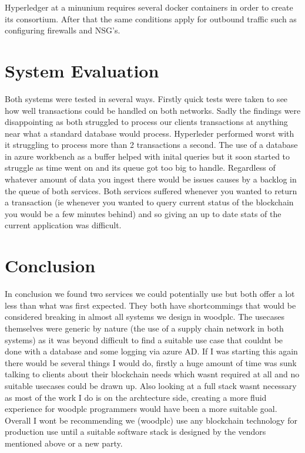 \documentclass[runningheads]{llncs}
\begin{document}
Hyperledger at a minunium requires several docker containers in order to create its consortium. After that the same conditions apply for outbound traffic such as configuring firewalls and NSG's.

\section{System Evaluation}
Both systems were tested in several ways. Firstly quick tests were taken to see how well transactions could be handled on both networks. Sadly the findings were disappointing as both struggled to process our clients transactions at anything near what a standard database would process. Hyperleder performed worst with it struggling to process more than 2 transactions a second. The use of a database in azure workbench as a buffer helped with inital queries but it soon started to struggle as time went on and its queue got too big to handle. Regardless of whatever amount of data you ingest there would be issues causes by a backlog in the queue of both services. Both services suffered whenever you wanted to return a transaction (ie whenever you wanted to query current status of the blockchain you would be a few minutes behind) and so giving an up to date stats of the current application was difficult.


\section{Conclusion}
In conclusion we found two services we could potentially use but both offer a lot less than what was first expected. They both have shortcommings that would be considered breaking in almost all systems we design in woodplc. The usecases themselves were generic by nature (the use of a supply chain network in both systems) as it was beyond difficult to find a suitable use case that couldnt be done with a database and some logging via azure AD. 
If I was starting this again there would be several things I would do, firstly a huge amount of time was sunk talking to clients about their blockchain needs which wasnt required at all and no suitable usecases could be drawn up. Also looking at a full stack wasnt necessary as most of the work I do is on the archtecture side, creating a more fluid experience for woodplc programmers would have been a more suitable goal.
Overall I wont be recommending we (woodplc) use any blockchain technology for production use until a suitable software stack is designed by the vendors mentioned above or a new party. 
\end{document}
